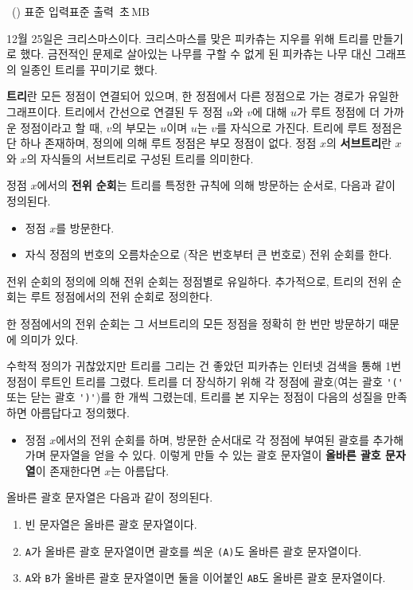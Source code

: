 \begin{problem}{\kcpcprobpretty\ (\kcpcprobprettyshort)}
    {표준 입력}{표준 출력}
    {\kcpcprobprettytime\,초}{\kcpcprobprettymemory\,MB}{}
     
    12월 25일은 크리스마스이다. 크리스마스를 맞은 피카츄는 지우를 위해 트리를 만들기로 했다. 금전적인 문제로 살아있는 나무를 구할 수 없게 된 피카츄는 나무 대신 그래프의 일종인 트리를 꾸미기로 했다.
    
    \textbf{트리}란 모든 정점이 연결되어 있으며, 한 정점에서 다른 정점으로 가는 경로가 유일한 그래프이다. 트리에서 간선으로 연결된 두 정점 $u$와 $v$에 대해 $u$가 루트 정점에 더 가까운 정점이라고 할 때, $v$의 부모는 $u$이며 $u$는 $v$를 자식으로 가진다. 트리에 루트 정점은 단 하나 존재하며, 정의에 의해 루트 정점은 부모 정점이 없다. 정점 $x$의 \textbf{서브트리}란 $x$와 $x$의 자식들의 서브트리로 구성된 트리를 의미한다.
    
    정점 $x$에서의 \textbf{전위 순회}는 트리를 특정한 규칙에 의해 방문하는 순서로, 다음과 같이 정의된다.
    
    \begin{itemize}
        \item 정점 $x$를 방문한다.
        \item 자식 정점의 번호의 오름차순으로 (작은 번호부터 큰 번호로) 전위 순회를 한다.
    \end{itemize}
    전위 순회의 정의에 의해 전위 순회는 정점별로 유일하다. 추가적으로, 트리의 전위 순회는 루트 정점에서의 전위 순회로 정의한다.
    
    한 정점에서의 전위 순회는 그 서브트리의 모든 정점을 정확히 한 번만 방문하기 때문에 의미가 있다.
    
    수학적 정의가 귀찮았지만 트리를 그리는 건 좋았던 피카츄는 인터넷 검색을 통해 1번 정점이 루트인 트리를 그렸다. 트리를 더 장식하기 위해 각 정점에 괄호(여는 괄호 \verb|'('| 또는 닫는 괄호 \verb|')'|)를 한 개씩 그렸는데, 트리를 본 지우는 정점이 다음의 성질을 만족하면 아름답다고 정의했다.
    
    \begin{itemize}
        \item 정점 $x$에서의 전위 순회를 하며, 방문한 순서대로 각 정점에 부여된 괄호를 추가해가며 문자열을 얻을 수 있다. 이렇게 만들 수 있는 괄호 문자열이 \textbf{올바른 괄호 문자열}이 존재한다면 $ x $는 아름답다.    
    \end{itemize}
    
    올바른 괄호 문자열은 다음과 같이 정의된다.
    \begin{enumerate}
        \item 빈 문자열은 올바른 괄호 문자열이다.
        \item \verb|A|가 올바른 괄호 문자열이면 괄호를 씌운 \verb|(A)|도 올바른 괄호 문자열이다.
        \item \verb|A|와 \verb|B|가 올바른 괄호 문자열이면 둘을 이어붙인 \verb|AB|도 올바른 괄호 문자열이다.
    \end{enumerate}
    

\end{problem}
